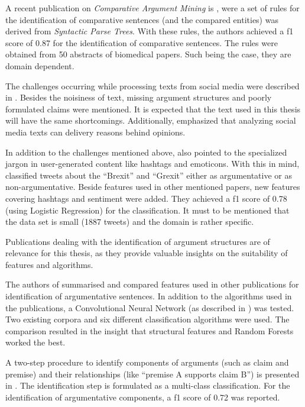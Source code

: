 A recent publication on \emph{Comparative Argument Mining} is \cite{gupta2017identifying}, were a set of rules for the identification of comparative sentences (and the compared entities) was derived from \emph{Syntactic Parse Trees}. With these rules, the authors achieved a f1 score of 0.87 for the identification of comparative sentences. The rules were obtained from 50 abstracts of biomedical papers. Such being the case, they are domain dependent.\newline

The challenges occurring while processing texts from social media were described in \cite{Snajder2017Social-Media-Ar}. Besides the noisiness of text, missing argument structures and poorly formulated claims were mentioned. It is expected that the text used in this thesis will have the same shortcomings. Additionally, \cite{Snajder2017Social-Media-Ar} emphasized that analyzing social media texts can delivery reasons behind opinions.

In addition to the challenges mentioned above, \cite{Dusmanu2017Argument-Mining} also pointed to the specialized jargon in user-generated content like hashtags and emoticons. With this in mind, \cite{Dusmanu2017Argument-Mining} classified tweets about the \enquote{Brexit} and \enquote{Grexit} either as argumentative or as non-argumentative. Beside features used in other mentioned papers, new features covering hashtags and sentiment were added. They achieved a f1 score of 0.78 (using Logistic Regression) for the classification. It must to be mentioned that the data set is small (1887 tweets) and the domain is rather specific.\newline

Publications dealing with the identification of argument structures are of relevance for this thesis, as they provide valuable insights on the suitability of features and algorithms.

The authors of \cite{Aker2017What-works-and-} summarised and compared features used in other publications for identification of argumentative sentences. In addition to the algorithms used in the publications, a Convolutional Neural Network (as described in \cite{Kim2014Convolutional-N}) was tested. Two existing corpora and six different classification algorithms were used. The comparison resulted in the insight that structural features and Random Forests worked the best.

A two-step procedure to identify components of arguments (such as claim and premise) and their relationships (like \enquote{premise A supports claim B}) is presented in \cite{Stab2014Identifying-Arg}. The identification step is formulated as a multi-class classification. For the identification of argumentative components, a f1 score of 0.72 was reported.


